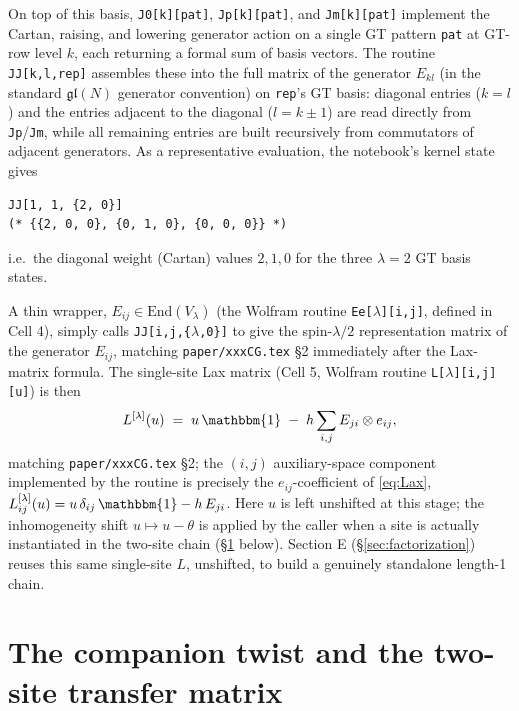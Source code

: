 \documentclass[11pt]{article}
\begin{document}
On top of this basis, \texttt{J0[k][pat]}, \texttt{Jp[k][pat]}, and \texttt{Jm[k][pat]} implement
the Cartan, raising, and lowering generator action on a single GT pattern \texttt{pat} at GT-row
level $k$, each returning a formal sum of basis vectors. The routine \texttt{JJ[k,l,rep]} assembles
these into the full matrix of the generator $E_{kl}$ (in the standard $\mathfrak{gl}(N)$ generator
convention) on \texttt{rep}'s GT basis: diagonal entries ($k=l$) and the entries adjacent to the
diagonal ($l=k\pm1$) are read directly from \texttt{Jp}/\texttt{Jm}, while all remaining entries are
built recursively from commutators of adjacent generators. As a representative evaluation, the
notebook's kernel state gives
\begin{verbatim}
JJ[1, 1, {2, 0}]
(* {{2, 0, 0}, {0, 1, 0}, {0, 0, 0}} *)
\end{verbatim}
i.e.\ the diagonal weight (Cartan) values $2,1,0$ for the three $\lambda=2$ GT basis states.

A thin wrapper, $E_{ij}\in\mathrm{End}(V_\lambda)$ (the Wolfram routine \texttt{Ee[$\lambda$][i,j]},
defined in Cell 4), simply calls \texttt{JJ[i,j,\{$\lambda$,0\}]} to give the spin-$\lambda/2$
representation matrix of the generator $E_{ij}$, matching \texttt{paper/xxxCG.tex} \S2 immediately
after the Lax-matrix formula. The single-site Lax matrix (Cell 5, Wolfram routine
\texttt{L[$\lambda$][i,j][u]}) is then
\begin{equation}
  L^{[\lambda]}(u) \;=\; u\,\mathbbm{1} \;-\; h \sum_{i,j} E_{ji}\otimes e_{ij},
  \label{eq:Lax}
\end{equation}
matching \texttt{paper/xxxCG.tex} \S2; the $(i,j)$ auxiliary-space component implemented by the
routine is precisely the $e_{ij}$-coefficient of \eqref{eq:Lax},
$L^{[\lambda]}_{ij}(u) = u\,\delta_{ij}\,\mathbbm{1} - h\,E_{ji}$.
Here $u$ is left unshifted at this stage; the inhomogeneity shift $u\mapsto u-\theta$ is applied by
the caller when a site is actually instantiated in the two-site chain (\S\ref{sec:twosite} below).
Section E (\S\ref{sec:factorization}) reuses this same single-site $L$, unshifted, to build a
genuinely standalone length-1 chain.

\section{The companion twist and the two-site transfer matrix}
\label{sec:twosite}
\end{document}
